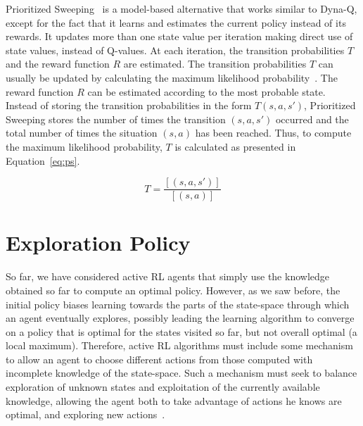 Prioritized Sweeping~\cite{moore1993prioritized} is a model-based alternative that works similar to Dyna-Q, except for the fact that it learns and estimates the current policy instead of its rewards.
It updates more than one state value per iteration making direct use of state values, instead of Q-values.
At each iteration, the transition probabilities $T$ and the reward function $R$ are estimated.
The transition probabilities $T$ can usually be updated by calculating the maximum likelihood probability~\cite{de2006reinforcement}.
The reward function $R$ can be estimated according to the most probable state.
Instead of storing the transition probabilities in the form $T(s,a,s')$, Prioritized Sweeping stores the number of times the transition $(s,a,s')$ occurred and the total number of times the situation $(s,a)$ has been reached.
Thus, to compute the maximum likelihood probability, $T$ is calculated as presented in Equation~\ref{eq:ps}.

\begin{equation} \label{eq:ps}
	T = \frac{[(s,a,s')]}{[(s,a)]}
\end{equation}



\section{Exploration Policy}
\label{sec:exploration}

So far, we have considered active RL agents that simply use the knowledge obtained so far to compute an optimal policy. 
However, as we saw before, the initial policy biases learning towards the parts of the state-space through which an agent eventually explores, possibly leading the learning algorithm to converge on a policy that is optimal for the states visited so far, but not overall optimal (a local maximum). 
Therefore, active RL algorithms must include some mechanism to allow an agent to choose different actions from those computed with incomplete knowledge of the state-space. 
Such a mechanism must seek to balance exploration of unknown states and exploitation of the currently available knowledge, allowing the agent both to take advantage of actions he knows are optimal, and exploring new actions~\cite{amato2010highlevel}. 

